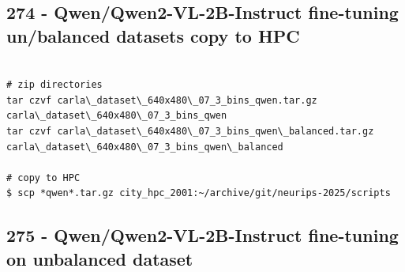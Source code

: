 \subsection{274 - Qwen/Qwen2-VL-2B-Instruct fine-tuning un/balanced datasets copy to HPC}
\label{app_res:274}

\begin{verbatim}

# zip directories
tar czvf carla\_dataset\_640x480\_07_3_bins_qwen.tar.gz carla\_dataset\_640x480\_07_3_bins_qwen
tar czvf carla\_dataset\_640x480\_07_3_bins_qwen\_balanced.tar.gz carla\_dataset\_640x480\_07_3_bins_qwen\_balanced

# copy to HPC
$ scp *qwen*.tar.gz city_hpc_2001:~/archive/git/neurips-2025/scripts
\end{verbatim}

\subsection{275 - Qwen/Qwen2-VL-2B-Instruct fine-tuning on unbalanced dataset}
\label{app_res:275}

